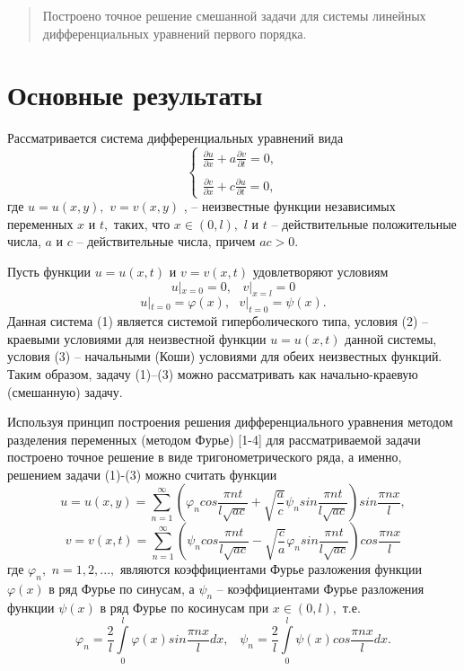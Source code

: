 \begin{abstract}
Построено точное решение смешанной задачи для системы линейных дифференциальных уравнений первого порядка. 

\end{abstract}

\section{Основные результаты} %

Рассматривается система дифференциальных уравнений  вида
\begin{equation} \label{1} 
\left\lbrace \begin{array}{cc}
\displaystyle\frac{\partial u}{\partial x}+ a \frac{\partial v}{\partial t}=0, \\
\\
\displaystyle\frac{\partial v}{\partial x}+ c \frac{\partial u}{\partial t}=0,
\end{array} \right.
\end{equation}
где 
$u=u(x,y),$
$v=v(x,y)$ ,   -- неизвестные функции независимых переменных 
$x$ 
 и 
 $t,$
 таких, что $x \in (0,l),$
 $l$
 и
 $t$
 -- действительные положительные числа,
 $a$
 и
 $c$
 -- действительные числа, причем
 $ac>0.$ 

Пусть функции
$u=u(x,t)$
и
$v=v(x,t)$
удовлетворяют условиям
\begin{equation}
u|_{x=0}=0 ,\,\,\,\,\, v|_{x=l} =0 
\end{equation}
\begin{equation}
u|_{t=0}=\varphi (x), \,\,\,\, v|_{t=0} =\psi (x).
\end{equation}
Данная система (1) является системой гиперболического типа, условия (2) -- краевыми условиями для неизвестной функции 
$u=u(x,t)$
данной системы, условия (3) -- начальными (Коши) условиями для обеих неизвестных функций. Таким образом, задачу (1)--(3) можно рассматривать как начально-краевую (смешанную) задачу.

Используя принцип построения решения дифференциального уравнения методом разделения переменных (методом Фурье) [1-4] для рассматриваемой задачи построено точное решение в виде тригонометрического ряда, а именно, решением задачи (1)-(3) можно считать функции 
$$u=u(x,y)=\sum\limits_{n=1}^{\infty} \left( \varphi_n cos\frac{\pi nt}{l\sqrt{ac}} + \sqrt{\frac{a}{c}} \psi_n sin \frac{\pi nt}{l\sqrt{ac}} \right) sin \frac{\pi nx}{l}, $$
$$v=v(x,t)= \sum\limits_{n=1}^{\infty} \left( \psi_n cos\frac{\pi nt}{l\sqrt{ac}} - \sqrt{\frac{c}{a}} \varphi_n sin \frac{\pi nt}{l\sqrt{ac}} \right) cos \frac{\pi nx}{l} $$
где
$\varphi_n,$ $n=1,2,...,$
являются коэффициентами Фурье разложения функции
$\varphi (x)$
в ряд Фурье по синусам, а 
$\psi_n$
 -- коэффициентами Фурье разложения функции   
$\psi(x)$ 
 в ряд Фурье по косинусам при
$x \in (0,l),$
т.е.
$$\varphi_n=\frac{2}{l}\int\limits_{0}^{l} \varphi (x) sin \frac{\pi nx}{l} dx, \,\,\,\,\, \psi_n=\frac{2}{l}\int\limits_{0}^{l} \psi (x) cos \frac{\pi nx}{l} dx. $$					

